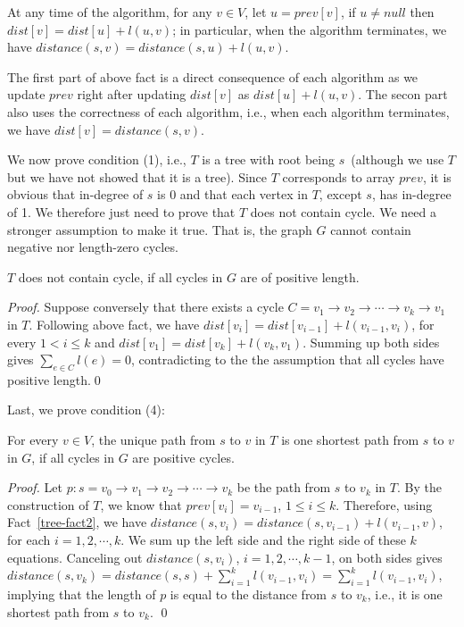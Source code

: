 \begin{fact}
\label{tree-fact2}
At any time of the algorithm, for any $v\in V$, let $u = prev[v]$, if $u\neq null$ then $dist[v] = dist[u] + l(u,v)$;
in particular, when the algorithm terminates, we have $distance(s,v) = distance(s,u) + l(u,v)$.
\end{fact}
The first part of above fact is a direct consequence of each algorithm as we update $prev$ right after updating $dist[v]$ as $dist[u] + l(u,v)$.
The secon part also uses the correctness of each algorithm, i.e., when each algorithm terminates, we have $dist[v] = distance(s,v)$.

We now prove condition (1), i.e., $T$ is a tree with root being $s$~(although we use $T$ but we have not showed that it is a tree).
Since $T$ corresponds to array $prev$, it is obvious that in-degree of $s$ is 0 and that each vertex in $T$, except $s$,
has in-degree of 1. We therefore just need to prove that $T$ does not contain cycle. 
We need a stronger assumption to make it true. That is, the graph $G$ cannot contain negative nor length-zero cycles.

\begin{fact}
$T$ does not contain cycle, if all cycles in $G$ are of positive length.
\end{fact}
\emph{Proof.} Suppose conversely that there exists a cycle $C = v_1\to v_2\to \cdots \to v_k\to v_1$ in $T$.
Following above fact, we have $dist[v_i] = dist[v_{i-1}] + l(v_{i-1},v_i)$, for every $1 < i \le k$
and $dist[v_1] = dist[v_k] + l(v_k,v_1)$.
Summing up both sides gives $\sum_{e\in C} l(e) = 0$, contradicting to the the assumption
that all cycles have positive length.\qed

Last, we prove condition (4):
\begin{claim}
For every $v\in V$, the unique path from $s$ to $v$ in $T$ is one shortest path from $s$ to $v$ in $G$,
if all cycles in $G$ are positive cycles.
\end{claim}
\emph{Proof.} 
Let $p: s = v_0 \to v_1 \to v_2 \to \cdots \to v_k$ be the path from $s$ to $v_k$ in $T$.
By the construction of $T$, we know that $prev[v_i] = v_{i - 1}$, $1\le i \le k$.
Therefore, using Fact~\ref{tree-fact2}, we have $distance(s, v_i) = distance(s, v_{i-1}) + l(v_{i-1}, v)$,
for each $i = 1, 2, \cdots, k$. We sum up the left side and the right side of these $k$ equations.
Canceling out $distance(s, v_i)$, $i = 1, 2, \cdots, k-1$, on both sides gives
$distance(s,v_k) = distance(s, s) + \sum_{i=1}^k l(v_{i-1}, v_i) = \sum_{i=1}^k l(v_{i-1}, v_i)$, implying that
the length of $p$ is equal to the distance from $s$ to $v_k$, i.e., it is one shortest path from $s$ to $v_k$. \qed


